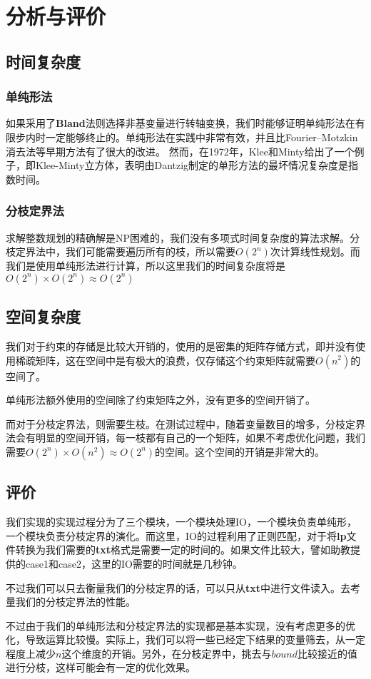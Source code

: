 \chapter{分析与评价}
\section{时间复杂度}
\subsection{单纯形法}
如果采用了\textbf{Bland}法则选择非基变量进行转轴变换，我们时能够证明单纯形法在有限步内时一定能够终止的。单纯形法在实践中非常有效，并且比Fourier–Motzkin消去法\cite{Fourier}等早期方法有了很大的改进。 然而，在1972年，Klee和Minty\cite{EXP}给出了一个例子，即Klee-Minty立方体，表明由Dantzig制定的单形方法的最坏情况复杂度是指数时间。

\subsection{分枝定界法}
求解整数规划的精确解是NP困难的，我们没有多项式时间复杂度的算法求解。分枝定界法中，我们可能需要遍历所有的枝，所以需要$O(2^n)$次计算线性规划。而我们是使用单纯形法进行计算，所以这里我们的时间复杂度将是$O(2^n)\times O(2^n) \approx O(2^n)​$

\section{空间复杂度}
我们对于约束的存储是比较大开销的，使用的是密集的矩阵存储方式，即并没有使用稀疏矩阵，这在空间中是有极大的浪费，仅存储这个约束矩阵就需要$O(n^{2})$的空间了。

单纯形法额外使用的空间除了约束矩阵之外，没有更多的空间开销了。

而对于分枝定界法，则需要生枝。在测试过程中，随着变量数目的增多，分枝定界法会有明显的空间开销，每一枝都有自己的一个矩阵，如果不考虑优化问题，我们需要$O(2^{n}) \times O(n^2) \approx O(2^n)$的空间。这个空间的开销是非常大的。

\section{评价}
我们实现的实现过程分为了三个模块，一个模块处理IO，一个模块负责单纯形，一个模块负责分枝定界的演化。而这里，IO的过程利用了正则匹配，对于将\textbf{lp}文件转换为我们需要的\textbf{txt}格式是需要一定的时间的。如果文件比较大，譬如助教提供的case1和case2，这里的IO需要的时间就是几秒钟。

不过我们可以只去衡量我们的分枝定界的话，可以只从\textbf{txt}中进行文件读入。去考量我们的分枝定界法的性能。

不过由于我们的单纯形法和分枝定界法的实现都是基本实现，没有考虑更多的优化，导致运算比较慢。实际上，我们可以将一些已经定下结果的变量筛去，从一定程度上减少$n$这个维度的开销。另外，在分枝定界中，挑去与$bound$比较接近的值进行分枝，这样可能会有一定的优化效果。